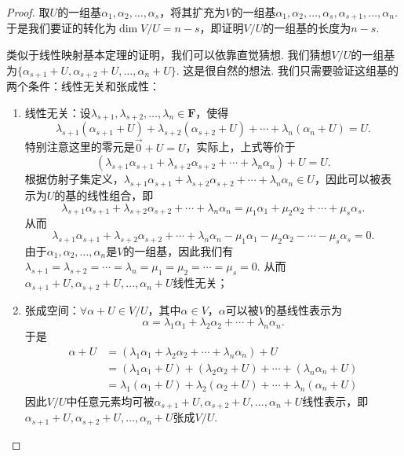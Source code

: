 \begin{proof}
    取$U$的一组基$\alpha_1,\alpha_2,\ldots,\alpha_s$，将其扩充为$V$的一组基$\alpha_1,\alpha_2,\ldots,\alpha_s,\alpha_{s+1},\ldots,\alpha_n$. 于是我们要证的转化为$\dim V/U=n-s$，即证明$V/U$的一组基的长度为$n-s$.

    类似于线性映射基本定理的证明，我们可以依靠直觉猜想. 我们猜想$V/U$的一组基为$\{\alpha_{s+1}+U,\alpha_{s+2}+U,\ldots,\alpha_n+U\}$. 这是很自然的想法. 我们只需要验证这组基的两个条件：线性无关和张成性：
    \begin{enumerate}
        \item 线性无关：设$\lambda_{s+1},\lambda_{s+2},\ldots,\lambda_n\in\mathbf{F}$，使得
              \[\lambda_{s+1}(\alpha_{s+1}+U)+\lambda_{s+2}(\alpha_{s+2}+U)+\cdots+\lambda_n(\alpha_n+U)=U.\]
              特别注意这里的零元是$\vec{0}+U=U$，实际上，上式等价于
              \[(\lambda_{s+1}\alpha_{s+1}+\lambda_{s+2}\alpha_{s+2}+\cdots+\lambda_n\alpha_n)+U=U.\]
              根据仿射子集定义，$\lambda_{s+1}\alpha_{s+1}+\lambda_{s+2}\alpha_{s+2}+\cdots+\lambda_n\alpha_n\in U$，因此可以被表示为$U$的基的线性组合，即
              \[\lambda_{s+1}\alpha_{s+1}+\lambda_{s+2}\alpha_{s+2}+\cdots+\lambda_n\alpha_n=\mu_1\alpha_1+\mu_2\alpha_2+\cdots+\mu_s\alpha_s.\]
              从而
              \[\lambda_{s+1}\alpha_{s+1}+\lambda_{s+2}\alpha_{s+2}+\cdots+\lambda_n\alpha_n-\mu_1\alpha_1-\mu_2\alpha_2-\cdots-\mu_s\alpha_s=0.\]
              由于$\alpha_1,\alpha_2,\ldots,\alpha_n$是$V$的一组基，因此我们有$\lambda_{s+1}=\lambda_{s+2}=\cdots=\lambda_n=\mu_1=\mu_2=\cdots=\mu_s=0$. 从而$\alpha_{s+1}+U,\alpha_{s+2}+U,\ldots,\alpha_n+U$线性无关；

        \item 张成空间：$\forall\alpha+U\in V/U$，其中$\alpha\in V$，$\alpha$可以被$V$的基线性表示为
              \[\alpha=\lambda_1\alpha_1+\lambda_2\alpha_2+\cdots+\lambda_n\alpha_n.\]
              于是
              \begin{align*}
                  \alpha+U & =(\lambda_1\alpha_1+\lambda_2\alpha_2+\cdots+\lambda_n\alpha_n)+U         \\
                           & =(\lambda_1\alpha_1+U)+(\lambda_2\alpha_2+U)+\cdots+(\lambda_n\alpha_n+U) \\
                           & =\lambda_1(\alpha_1+U)+\lambda_2(\alpha_2+U)+\cdots+\lambda_n(\alpha_n+U)
              \end{align*}
              因此$V/U$中任意元素均可被$\alpha_{s+1}+U,\alpha_{s+2}+U,\ldots,\alpha_n+U$线性表示，即$\alpha_{s+1}+U,\alpha_{s+2}+U,\ldots,\alpha_n+U$张成$V/U$.
    \end{enumerate}
\end{proof}

